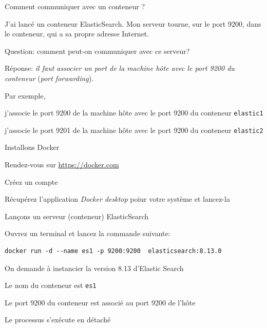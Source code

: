 \begin{frame}{Comment communiquer avec un conteneur ?}

J'ai lancé un conteneur ElasticSearch. Mon serveur tourne, sur le port 
9200, \alert{dans le conteneur}, qui a sa propre adresse Internet.

\vfill

\alert{Question:} comment peut-on communiquer avec ce serveur?

\vfill

\alert{Réponse}: \emph{il faut associer un port de la machine hôte avec le port 
9200 du conteneur} (\textit{port forwarding}).

\vfill

Par exemple, 
\begin{redbullet}
 \item j'associe  le port 9200 de la machine hôte avec le port 9200 du conteneur \texttt{elastic1}
 \item j'associe  le port 9201 de la machine hôte avec le port 9200 du conteneur \texttt{elastic2}
\end{redbullet}


\end{frame}

\begin{frame}{Installons Docker}

Rendez-vous sur \url{https://docker.com}

\vfill

\begin{redbullet}
	\item Créez un compte 
	\item Récupérez l'application \textit{Docker desktop} poiur votre système et lancez-la
\end{redbullet}

\vfill

\centerline{}

\end{frame}


\begin{frame}[fragile]{Lançons un serveur (conteneur) ElasticSearch}


Ouvrez un terminal et lancez la commande suivante:

\begin{verbatim}
docker run -d --name es1 -p 9200:9200  elasticsearch:8.13.0
\end{verbatim}

\vfil
\begin{redbullet}
	\item On demande à instancier la version 8.13 d'Elastic Search  
	\item Le nom du conteneur est \texttt{es1}
	\item Le port 9200 du conteneur est associé au port 9200 de l'hôte
	\item Le processus s'exécute en détaché 
\end{redbullet}

\end{frame}


